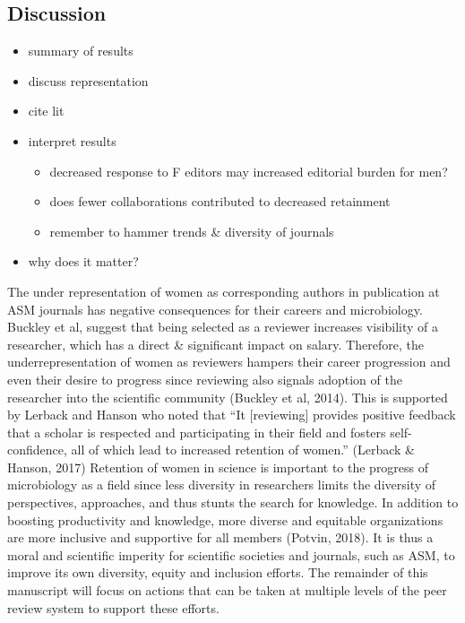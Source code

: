 \documentclass[11pt,]{article}
\providecommand{\tightlist}{%
  \setlength{\itemsep}{0pt}\setlength{\parskip}{0pt}}
\begin{document}
\subsection{Discussion}\label{discussion}

\begin{itemize}
\item
  summary of results
\item
  discuss representation
\item
  cite lit
\item
  interpret results

  \begin{itemize}
  \tightlist
  \item
    decreased response to F editors may increased editorial burden for
    men?
  \item
    does fewer collaborations contributed to decreased retainment
  \item
    remember to hammer trends \& diversity of journals
  \end{itemize}
\item
  why does it matter?
\end{itemize}

The under representation of women as corresponding authors in
publication at ASM journals has negative consequences for their careers
and microbiology. Buckley et al, suggest that being selected as a
reviewer increases visibility of a researcher, which has a direct \&
significant impact on salary. Therefore, the underrepresentation of
women as reviewers hampers their career progression and even their
desire to progress since reviewing also signals adoption of the
researcher into the scientific community (Buckley et al, 2014). This is
supported by Lerback and Hanson who noted that ``It {[}reviewing{]}
provides positive feedback that a scholar is respected and participating
in their field and fosters self-confidence, all of which lead to
increased retention of women.'' (Lerback \& Hanson, 2017) Retention of
women in science is important to the progress of microbiology as a field
since less diversity in researchers limits the diversity of
perspectives, approaches, and thus stunts the search for knowledge. In
addition to boosting productivity and knowledge, more diverse and
equitable organizations are more inclusive and supportive for all
members (Potvin, 2018). It is thus a moral and scientific imperity for
scientific societies and journals, such as ASM, to improve its own
diversity, equity and inclusion efforts. The remainder of this
manuscript will focus on actions that can be taken at multiple levels of
the peer review system to support these efforts.
\end{document}
